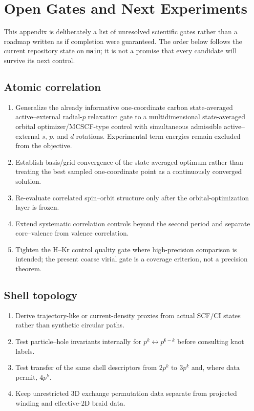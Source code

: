\chapter{Open Gates and Next Experiments}
\label{app:open-gates}

This appendix is deliberately a list of unresolved scientific gates rather than a roadmap written as if completion were guaranteed.  The order below follows the current repository state on \texttt{main}; it is not a promise that every candidate will survive its next control.

\section{Atomic correlation}
\begin{enumerate}
\item Generalize the already informative one-coordinate carbon state-averaged active--external radial-$p$ relaxation gate to a multidimensional state-averaged orbital optimizer/MCSCF-type control with simultaneous admissible active--external $s$, $p$, and $d$ rotations.  Experimental term energies remain excluded from the objective.
\item Establish basis/grid convergence of the state-averaged optimum rather than treating the best sampled one-coordinate point as a continuously converged solution.
\item Re-evaluate correlated spin--orbit structure only after the orbital-optimization layer is frozen.
\item Extend systematic correlation controls beyond the second period and separate core--valence from valence correlation.
\item Tighten the H--Kr control quality gate where high-precision comparison is intended; the present coarse virial gate is a coverage criterion, not a precision theorem.
\end{enumerate}

\section{Shell topology}
\begin{enumerate}
\item Derive trajectory-like or current-density proxies from actual SCF/CI states rather than synthetic circular paths.
\item Test particle--hole invariants internally for $p^k\leftrightarrow p^{6-k}$ before consulting knot labels.
\item Test transfer of the same shell descriptors from $2p^k$ to $3p^k$ and, where data permit, $4p^k$.
\item Keep unrestricted 3D exchange permutation data separate from projected winding and effective-2D braid data.
\end{enumerate}

